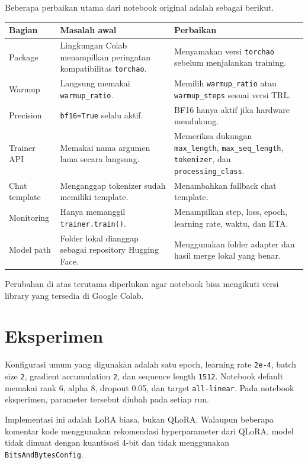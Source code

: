 \documentclass[12pt,a4paper]{article}
\begin{document}
Beberapa perbaikan utama dari notebook original adalah sebagai berikut.

\begin{longtable}{p{} p{} p{}}
\toprule
\textbf{Bagian} & \textbf{Masalah awal} & \textbf{Perbaikan} \\
\midrule
Package & Lingkungan Colab menampilkan peringatan kompatibilitas \texttt{torchao}. & Menyamakan versi \texttt{torchao} sebelum menjalankan training. \\
Warmup & Langsung memakai \texttt{warmup\_ratio}. & Memilih \texttt{warmup\_ratio} atau \texttt{warmup\_steps} sesuai versi TRL. \\
Precision & \texttt{bf16=True} selalu aktif. & BF16 hanya aktif jika hardware mendukung. \\
Trainer API & Memakai nama argumen lama secara langsung. & Memeriksa dukungan \texttt{max\_length}, \texttt{max\_seq\_length}, \texttt{tokenizer}, dan \texttt{processing\_class}. \\
Chat template & Menganggap tokenizer sudah memiliki template. & Menambahkan fallback chat template. \\
Monitoring & Hanya memanggil \texttt{trainer.train()}. & Menampilkan step, loss, epoch, learning rate, waktu, dan ETA. \\
Model path & Folder lokal dianggap sebagai repository Hugging Face. & Menggunakan folder adapter dan hasil merge lokal yang benar. \\
\bottomrule
\end{longtable}

Perubahan di atas terutama diperlukan agar notebook bisa mengikuti versi library yang tersedia di Google Colab.

\section{Eksperimen}

Konfigurasi umum yang digunakan adalah satu epoch, learning rate \texttt{2e-4},
batch size \texttt{2}, gradient accumulation \texttt{2}, dan sequence length
\texttt{1512}. Notebook default memakai rank 6, alpha 8, dropout 0.05, dan
target \texttt{all-linear}. Pada notebook eksperimen, parameter tersebut
diubah pada setiap run.

Implementasi ini adalah LoRA biasa, bukan QLoRA. Walaupun beberapa komentar
kode menggunakan rekomendasi hyperparameter dari QLoRA, model tidak dimuat
dengan kuantisasi 4-bit dan tidak menggunakan \texttt{BitsAndBytesConfig}.
\end{document}
